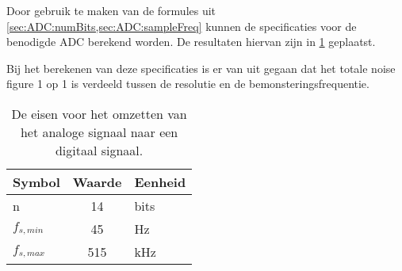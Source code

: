 Door gebruik te maken van de formules uit \cref{sec:ADC:numBits,sec:ADC:sampleFreq} kunnen de specificaties voor de benodigde ADC berekend worden. De resultaten hiervan zijn in  \cref{tab:specADC} geplaatst.

Bij het berekenen van deze specificaties is er van uit gegaan dat het totale noise figure 1 op 1 is verdeeld tussen de resolutie en de bemonsteringsfrequentie.
\begin{table}[!htbp]
    \centering
    \begin{tabular}{l|c|l}
        Symbol      & Waarde    & Eenheid\\\hline
        n           & 14        & bits\\
        $f_{s,min}$ & 45        & Hz\\
        $f_{s,max}$ & 515       & kHz\\
    \end{tabular}
    \caption{De eisen voor het omzetten van het analoge signaal naar een digitaal signaal.}
    \label{tab:specADC}
\end{table}


